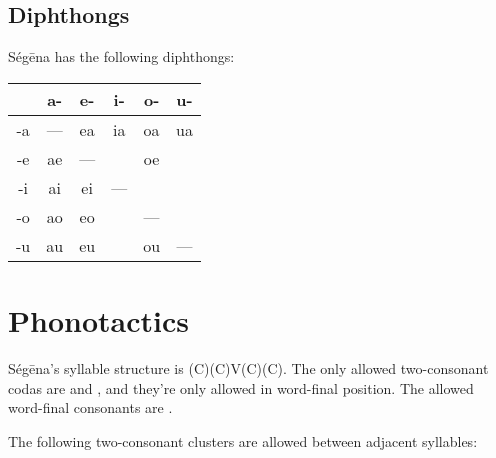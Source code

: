 \subsection{Diphthongs}

Ségēna has the following diphthongs:

\begin{table}[H]
\begin{tabular}{ c|c|c|c|c|c }
	   & a- & e- & i- & o- & u- \\
	\hline
	-a & —  & ea & ia & oa & ua \\
	-e & ae & —  &    & oe &    \\
	-i & ai & ei & —  &    &    \\
	-o & ao & eo &    & —  &    \\
	-u & au & eu &    & ou & —  \\
\end{tabular}
\end{table}

\section{Phonotactics}

Ségēna's syllable structure is (C)(C)V(C)(C). The only allowed two-consonant
codas are  and , and they're only allowed in
word-final position. The allowed word-final consonants are .

The following two-consonant clusters are allowed between adjacent syllables:

